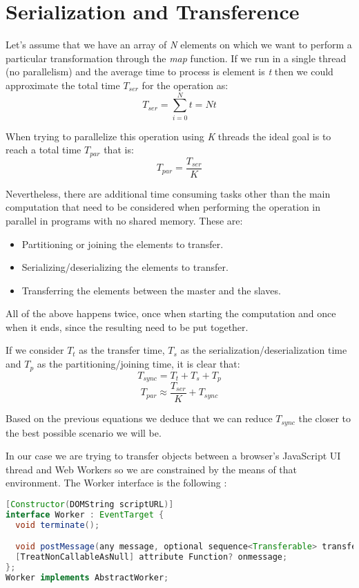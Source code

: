 \section*{Serialization and Transference}

Let's assume that we have an array of \textit{N} elements on which we want to perform a particular transformation through the \textit{map} function. If we run in a single thread (no parallelism) and the average time to process is element is \textit{t} then we could approximate the total time \(T_{ser}\) for the operation as:
\[T_{ser} = \sum_{i = 0}^{N}t = Nt\]

When trying to parallelize this operation using \textit{K} threads the ideal goal is to reach a total time \(T_{par}\) that is:
\[T_{par} = \frac{T_{ser}}{K}\]

Nevertheless, there are additional time consuming tasks other than the main computation that need to be considered when performing the operation in parallel in programs with no shared memory. These are:
\begin{itemize}
  \item Partitioning or joining the elements to transfer.
  \item Serializing/deserializing the elements to transfer.
  \item Transferring the elements between the master and the slaves.
\end{itemize}

All of the above happens twice, once when starting the computation and once when it ends, since the resulting need to be put together.

If we consider \(T_{t}\) as the transfer time, \(T_{s}\) as the serialization/deserialization time and \(T_{p}\) as the partitioning/joining time, it is clear that:
\[T_{sync} = T_{t} + T_{s} + T_{p}\]
\[T_{par} \approx \frac{T_{ser}}{K} + T_{sync}\]

Based on the previous equations we deduce that we can reduce \(T_{sync}\) the closer to the best possible scenario we will be.

In our case we are trying to transfer objects between a browser's JavaScript UI thread and Web Workers so we are constrained by the means of that environment. The Worker interface is the following \cite{w3c-ww}:
\begin{lstlisting}[language=Java, caption=The Worker interface]
[Constructor(DOMString scriptURL)]
interface Worker : EventTarget {
  void terminate();

  void postMessage(any message, optional sequence<Transferable> transfer);
  [TreatNonCallableAsNull] attribute Function? onmessage;
};
Worker implements AbstractWorker;
\end{lstlisting}

